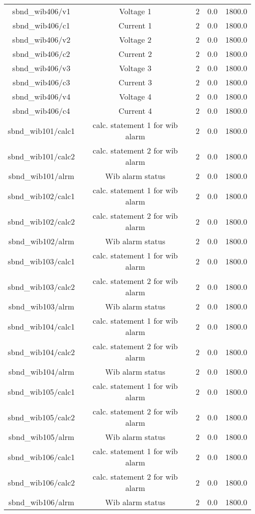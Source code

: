 \begin{table}[ptb]
\begin{tabular}{c | c c c c}
sbnd_wib406/v1 & Voltage 1 & 2 & 0.0 & 1800.0\\ 
sbnd_wib406/c1 & Current 1 & 2 & 0.0 & 1800.0\\ 
sbnd_wib406/v2 & Voltage 2 & 2 & 0.0 & 1800.0\\ 
sbnd_wib406/c2 & Current 2 & 2 & 0.0 & 1800.0\\ 
sbnd_wib406/v3 & Voltage 3 & 2 & 0.0 & 1800.0\\ 
sbnd_wib406/c3 & Current 3 & 2 & 0.0 & 1800.0\\ 
sbnd_wib406/v4 & Voltage 4 & 2 & 0.0 & 1800.0\\ 
sbnd_wib406/c4 & Current 4 & 2 & 0.0 & 1800.0\\ 
sbnd_wib101/calc1 & calc. statement 1 for wib alarm & 2 & 0.0 & 1800.0\\ 
sbnd_wib101/calc2 & calc. statement 2 for wib alarm & 2 & 0.0 & 1800.0\\ 
sbnd_wib101/alrm & Wib alarm status & 2 & 0.0 & 1800.0\\ 
sbnd_wib102/calc1 & calc. statement 1 for wib alarm & 2 & 0.0 & 1800.0\\ 
sbnd_wib102/calc2 & calc. statement 2 for wib alarm & 2 & 0.0 & 1800.0\\ 
sbnd_wib102/alrm & Wib alarm status & 2 & 0.0 & 1800.0\\ 
sbnd_wib103/calc1 & calc. statement 1 for wib alarm & 2 & 0.0 & 1800.0\\ 
sbnd_wib103/calc2 & calc. statement 2 for wib alarm & 2 & 0.0 & 1800.0\\ 
sbnd_wib103/alrm & Wib alarm status & 2 & 0.0 & 1800.0\\ 
sbnd_wib104/calc1 & calc. statement 1 for wib alarm & 2 & 0.0 & 1800.0\\ 
sbnd_wib104/calc2 & calc. statement 2 for wib alarm & 2 & 0.0 & 1800.0\\ 
sbnd_wib104/alrm & Wib alarm status & 2 & 0.0 & 1800.0\\ 
sbnd_wib105/calc1 & calc. statement 1 for wib alarm & 2 & 0.0 & 1800.0\\ 
sbnd_wib105/calc2 & calc. statement 2 for wib alarm & 2 & 0.0 & 1800.0\\ 
sbnd_wib105/alrm & Wib alarm status & 2 & 0.0 & 1800.0\\ 
sbnd_wib106/calc1 & calc. statement 1 for wib alarm & 2 & 0.0 & 1800.0\\ 
sbnd_wib106/calc2 & calc. statement 2 for wib alarm & 2 & 0.0 & 1800.0\\ 
sbnd_wib106/alrm & Wib alarm status & 2 & 0.0 & 1800.0\\ 

\end{tabular}
\end{table}
